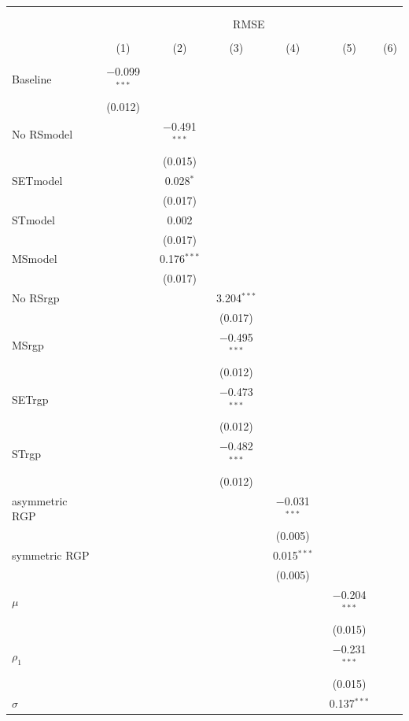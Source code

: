 \begin{tabular}{@{\extracolsep{5pt}}lcccccc} 
\\[-1.8ex]\hline 
\hline \\[-1.8ex] 
\\[-1.8ex] & \multicolumn{6}{c}{RMSE} \\ 
\\[-1.8ex] & (1) & (2) & (3) & (4) & (5) & (6)\\ 
\hline \\[-1.8ex] 
 Baseline & $-$0.099$^{***}$ &  &  &  &  &  \\ 
  & (0.012) &  &  &  &  &  \\ 
  No RSmodel &  & $-$0.491$^{***}$ &  &  &  &  \\ 
  &  & (0.015) &  &  &  &  \\ 
  SETmodel &  & 0.028$^{*}$ &  &  &  &  \\ 
  &  & (0.017) &  &  &  &  \\ 
  STmodel &  & 0.002 &  &  &  &  \\ 
  &  & (0.017) &  &  &  &  \\ 
  MSmodel &  & 0.176$^{***}$ &  &  &  &  \\ 
  &  & (0.017) &  &  &  &  \\ 
  No RSrgp &  &  & 3.204$^{***}$ &  &  &  \\ 
  &  &  & (0.017) &  &  &  \\ 
  MSrgp &  &  & $-$0.495$^{***}$ &  &  &  \\ 
  &  &  & (0.012) &  &  &  \\ 
  SETrgp &  &  & $-$0.473$^{***}$ &  &  &  \\ 
  &  &  & (0.012) &  &  &  \\ 
  STrgp &  &  & $-$0.482$^{***}$ &  &  &  \\ 
  &  &  & (0.012) &  &  &  \\ 
  asymmetric RGP &  &  &  & $-$0.031$^{***}$ &  &  \\ 
  &  &  &  & (0.005) &  &  \\ 
  symmetric RGP &  &  &  & 0.015$^{***}$ &  &  \\ 
  &  &  &  & (0.005) &  &  \\ 
  $\mu$ &  &  &  &  & $-$0.204$^{***}$ &  \\ 
  &  &  &  &  & (0.015) &  \\ 
  $\rho_{1}$ &  &  &  &  & $-$0.231$^{***}$ &  \\ 
  &  &  &  &  & (0.015) &  \\ 
  $\sigma$ &  &  &  &  & 0.137$^{***}$ &  \\ 

\end{tabular}
